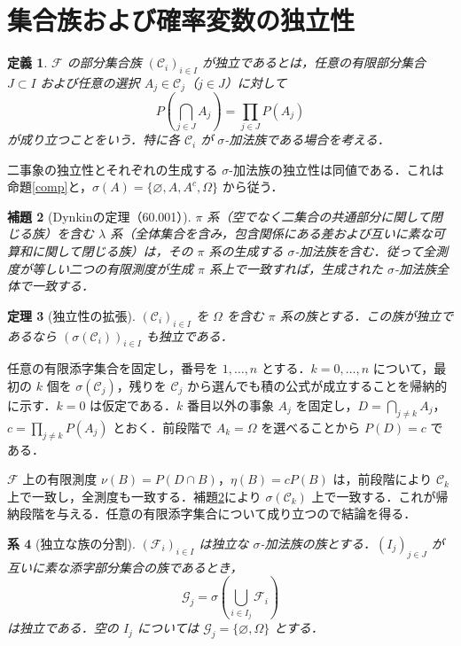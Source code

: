 \documentclass[a5paper,10pt,onecolumn]{jsarticle}
\makeatletter
\theoremstyle{mathnotetheorem}
\newtheorem{theorem}{定理}[section]
\newtheorem{definition}[theorem]{定義}
\newtheorem{lemma}[theorem]{補題}
\newtheorem{corollary}[theorem]{系}
\renewcommand{\proofname}{証明}
\renewenvironment{proof}[1][\proofname]{%
  \par\pushQED{\qed}\normalfont\topsep4\p@\@plus2\p@\relax
  \trivlist\item[\hskip\labelsep\bfseries #1]\ignorespaces
}{\popQED\endtrivlist\@endpefalse}
\newcommand{\F}{\mathcal F}
\newcommand{\1}{\mathbf{1}}
\makeatother
\begin{document}
\section{集合族および確率変数の独立性}
\begin{definition}
$\F$ の部分集合族 $(\mathcal C_i)_{i\in I}$ が独立であるとは，任意の有限部分集合 $J\subset I$ および任意の選択 $A_j\in\mathcal C_j$（$j\in J$）に対して
\[
 P\left(\bigcap_{j\in J}A_j\right)=\prod_{j\in J}P(A_j)
\]
が成り立つことをいう．特に各 $\mathcal C_i$ が $\sigma$-加法族である場合を考える．
\end{definition}
二事象の独立性とそれぞれの生成する $\sigma$-加法族の独立性は同値である．これは命題\ref{comp}と，$\sigma(A)=\{\varnothing,A,A^c,\Omega\}$ から従う．
\begin{lemma}[Dynkinの定理（60.001）]\label{dynkin}
$\pi$ 系（空でなく二集合の共通部分に関して閉じる族）を含む $\lambda$ 系（全体集合を含み，包含関係にある差および互いに素な可算和に関して閉じる族）は，その $\pi$ 系の生成する $\sigma$-加法族を含む．従って全測度が等しい二つの有限測度が生成 $\pi$ 系上で一致すれば，生成された $\sigma$-加法族全体で一致する．
\end{lemma}
\begin{theorem}[独立性の拡張]\label{extendind}
$(\mathcal C_i)_{i\in I}$ を $\Omega$ を含む $\pi$ 系の族とする．この族が独立であるなら $(\sigma(\mathcal C_i))_{i\in I}$ も独立である．
\end{theorem}
\begin{proof}
任意の有限添字集合を固定し，番号を $1,\ldots,n$ とする．$k=0,\ldots,n$ について，最初の $k$ 個を $\sigma(\mathcal C_j)$，残りを $\mathcal C_j$ から選んでも積の公式が成立することを帰納的に示す．$k=0$ は仮定である．$k$ 番目以外の事象 $A_j$ を固定し，$D=\bigcap_{j\ne k}A_j$，$c=\prod_{j\ne k}P(A_j)$ とおく．前段階で $A_k=\Omega$ を選べることから $P(D)=c$ である．

$\F$ 上の有限測度 $\nu(B)=P(D\cap B)$，$\eta(B)=cP(B)$ は，前段階により $\mathcal C_k$ 上で一致し，全測度も一致する．補題\ref{dynkin}により $\sigma(\mathcal C_k)$ 上で一致する．これが帰納段階を与える．任意の有限添字集合について成り立つので結論を得る．
\end{proof}
\begin{corollary}[独立な族の分割]\label{group}
$(\F_i)_{i\in I}$ は独立な $\sigma$-加法族の族とする．$(I_j)_{j\in J}$ が互いに素な添字部分集合の族であるとき，
\[
 \mathcal G_j=\sigma\left(\bigcup_{i\in I_j}\F_i\right)
\]
は独立である．空の $I_j$ については $\mathcal G_j=\{\varnothing,\Omega\}$ とする．
\end{corollary}
\end{document}
